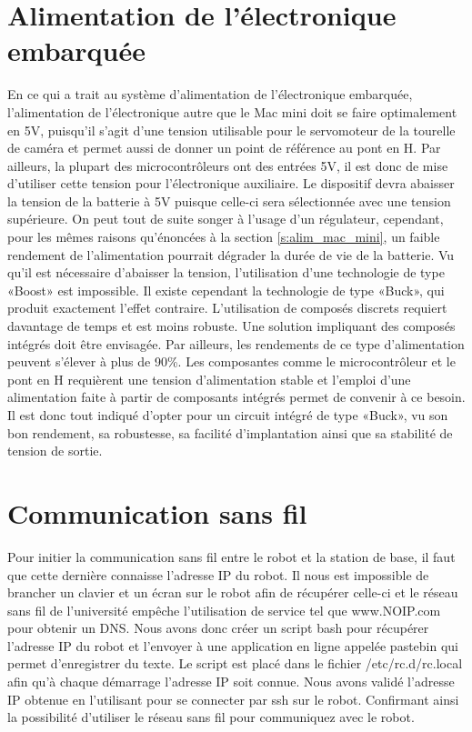 \section{Alimentation de l'électronique embarquée}
En ce qui a trait au système d'alimentation de l'électronique embarquée, l'alimentation de l'électronique autre que le Mac mini doit se faire optimalement en 5V, puisqu'il s'agit d'une tension utilisable pour le servomoteur de la tourelle de caméra et permet aussi de donner un point de référence au pont en H. Par ailleurs, la plupart des microcontrôleurs ont des entrées 5V, il est donc de mise d'utiliser cette tension pour l'électronique auxiliaire. Le dispositif devra abaisser la tension de la batterie à 5V puisque celle-ci sera sélectionnée avec une tension supérieure. On peut tout de suite songer à l'usage d'un régulateur, cependant, pour les mêmes raisons qu'énoncées à la section \ref{s:alim_mac_mini}, un faible rendement de l'alimentation pourrait dégrader la durée de vie de la batterie. Vu qu'il est nécessaire d'abaisser la tension, l'utilisation d'une technologie de type «Boost» est impossible. Il existe cependant la technologie de type «Buck», qui produit exactement l'effet contraire. L'utilisation de composés discrets requiert davantage de temps et est moins robuste. Une solution impliquant des composés intégrés doit être envisagée. Par ailleurs, les rendements de ce type d'alimentation peuvent s'élever à plus de 90\%. Les composantes comme le microcontrôleur et le pont en H requièrent une tension d'alimentation stable et l'emploi d'une alimentation faite à partir de composants intégrés permet de convenir à ce besoin. Il est donc tout indiqué d'opter pour un circuit intégré de type «Buck», vu son bon rendement, sa robustesse, sa facilité d'implantation ainsi que sa stabilité de tension de sortie.

\section{Communication sans fil}\label{s:sansfil}
Pour initier la communication sans fil entre le robot et la station de base, il faut que cette dernière connaisse l'adresse IP du robot. Il nous est impossible de brancher un clavier et un écran sur le robot afin de récupérer celle-ci et le réseau sans fil de l'université empêche l'utilisation de service tel que www.NOIP.com pour obtenir un DNS. Nous avons donc créer un script bash pour récupérer l'adresse IP du robot et l'envoyer à une application en ligne appelée pastebin qui permet d'enregistrer du texte. Le script est placé dans le fichier /etc/rc.d/rc.local afin qu'à chaque démarrage l'adresse IP soit connue. Nous avons validé l'adresse IP obtenue en l'utilisant pour se connecter par ssh sur le robot. Confirmant ainsi la possibilité d'utiliser le réseau sans fil pour communiquez avec le robot.

